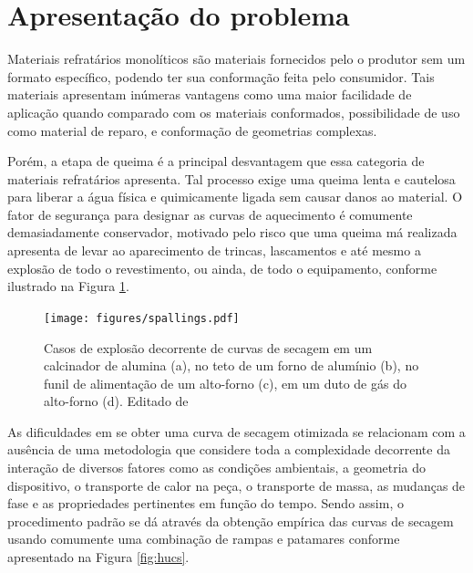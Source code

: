 \section{Apresentação do problema}
   Materiais refratários monolíticos são materiais fornecidos pelo o produtor
   sem um formato específico, podendo ter sua conformação feita pelo consumidor. Tais
   materiais apresentam inúmeras vantagens como uma maior facilidade de
   aplicação quando comparado com os materiais conformados, possibilidade de uso
   como material de reparo, e conformação de geometrias complexas.

   Porém, a etapa de queima é a principal desvantagem que essa
   categoria de materiais refratários apresenta. Tal processo exige uma queima
   lenta e cautelosa para liberar a água física e quimicamente ligada sem causar
   danos ao material. O fator de segurança para designar as curvas de
   aquecimento é comumente demasiadamente conservador, motivado pelo risco que
   uma queima má realizada apresenta de levar ao aparecimento de trincas, lascamentos e até mesmo a explosão de todo o revestimento, ou ainda, de todo o equipamento,
   conforme ilustrado na Figura \ref{fig:spalls}.
    
    \begin{figure}[ht]
        \centering
        \texttt{[image: figures/spallings.pdf]}
        \caption{Casos de explosão decorrente de curvas de secagem em um
          calcinador de alumina (a), no teto de um forno de alumínio (b), no
          funil de alimentação de um alto-forno (c), em um duto de gás do
          alto-forno (d). Editado de \cite{irish}}
        \label{fig:spalls}
   \end{figure}

   As dificuldades em se obter uma curva de secagem otimizada se relacionam com
   a ausência de uma metodologia que considere toda a complexidade decorrente da
   interação de diversos fatores como as condições ambientais, a geometria do
   dispositivo, o transporte de calor na peça, o transporte de massa, as
   mudanças de fase e as propriedades pertinentes em função do tempo. Sendo
   assim, o procedimento padrão se dá através da obtenção empírica das curvas de
   secagem usando comumente uma combinação de rampas e patamares conforme
   apresentado na Figura \ref{fig:hucs}.
      
